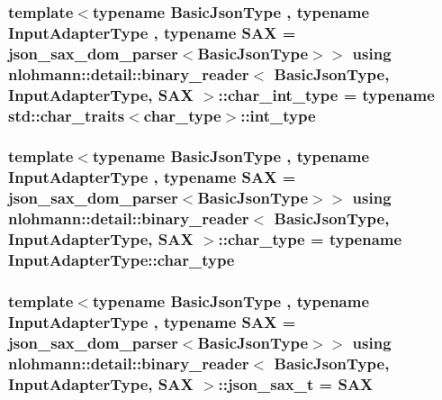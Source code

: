 \subsubsection[{\texorpdfstring{char\+\_\+int\+\_\+type}{char_int_type}}]{\setlength{\rightskip}{0pt plus 5cm}template$<$typename Basic\+Json\+Type , typename Input\+Adapter\+Type , typename S\+AX  = json\+\_\+sax\+\_\+dom\+\_\+parser$<$\+Basic\+Json\+Type$>$$>$ using {\bf nlohmann\+::detail\+::binary\+\_\+reader}$<$ Basic\+Json\+Type, Input\+Adapter\+Type, S\+AX $>$\+::{\bf char\+\_\+int\+\_\+type} =  typename std\+::char\+\_\+traits$<${\bf char\+\_\+type}$>$\+::int\+\_\+type\hspace{0.3cm}{\ttfamily [private]}}\hypertarget{classnlohmann_1_1detail_1_1binary__reader_aa12ade9a8c0acaebef6399e3d446b970}{}\label{classnlohmann_1_1detail_1_1binary__reader_aa12ade9a8c0acaebef6399e3d446b970}
\subsubsection[{\texorpdfstring{char\+\_\+type}{char_type}}]{\setlength{\rightskip}{0pt plus 5cm}template$<$typename Basic\+Json\+Type , typename Input\+Adapter\+Type , typename S\+AX  = json\+\_\+sax\+\_\+dom\+\_\+parser$<$\+Basic\+Json\+Type$>$$>$ using {\bf nlohmann\+::detail\+::binary\+\_\+reader}$<$ Basic\+Json\+Type, Input\+Adapter\+Type, S\+AX $>$\+::{\bf char\+\_\+type} =  typename Input\+Adapter\+Type\+::char\+\_\+type\hspace{0.3cm}{\ttfamily [private]}}\hypertarget{classnlohmann_1_1detail_1_1binary__reader_abc20ff256868de6791b3646ab33fff76}{}\label{classnlohmann_1_1detail_1_1binary__reader_abc20ff256868de6791b3646ab33fff76}
\subsubsection[{\texorpdfstring{json\+\_\+sax\+\_\+t}{json_sax_t}}]{\setlength{\rightskip}{0pt plus 5cm}template$<$typename Basic\+Json\+Type , typename Input\+Adapter\+Type , typename S\+AX  = json\+\_\+sax\+\_\+dom\+\_\+parser$<$\+Basic\+Json\+Type$>$$>$ using {\bf nlohmann\+::detail\+::binary\+\_\+reader}$<$ Basic\+Json\+Type, Input\+Adapter\+Type, S\+AX $>$\+::{\bf json\+\_\+sax\+\_\+t} =  S\+AX\hspace{0.3cm}{\ttfamily [private]}}\hypertarget{classnlohmann_1_1detail_1_1binary__reader_a4c33ab78a0df5afd524f16887550436d}{}\label{classnlohmann_1_1detail_1_1binary__reader_a4c33ab78a0df5afd524f16887550436d}
